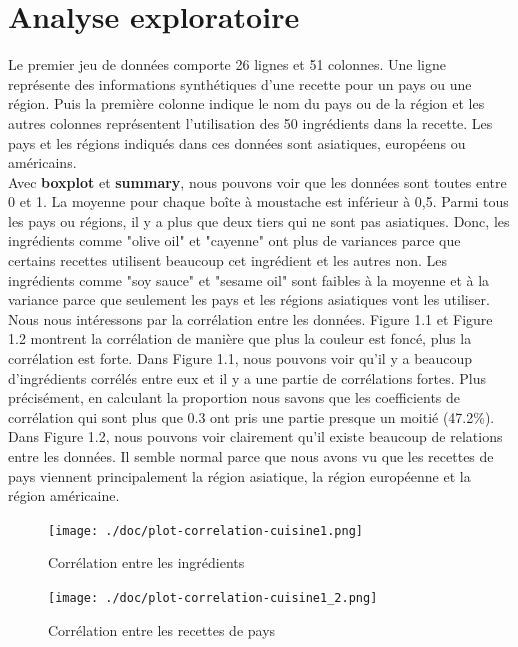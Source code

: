 \documentclass[a4paper, titlepage]{report}
\begin{document}
\section{Analyse exploratoire}
Le premier jeu de données comporte 26 lignes et 51 colonnes. Une ligne représente des informations synthétiques d'une recette pour un pays ou une région. Puis la première colonne indique le nom du pays ou de la région et les autres colonnes représentent l'utilisation des 50 ingrédients dans la recette. Les pays et les régions indiqués dans ces données sont asiatiques, européens ou américains.\\
\indent Avec \textbf{boxplot} et \textbf{summary}, nous pouvons voir que les données sont toutes entre 0 et 1. La moyenne pour chaque boîte à moustache est inférieur à 0,5. Parmi tous les pays ou régions, il y a plus que deux tiers qui ne sont pas asiatiques. Donc, les ingrédients comme "olive oil" et "cayenne" ont plus de variances parce que certains recettes utilisent beaucoup cet ingrédient et les autres non. Les ingrédients comme "soy sauce" et "sesame oil" sont faibles à la moyenne et à la variance parce que seulement les pays et les régions asiatiques vont les utiliser.\\
\indent Nous nous intéressons par la corrélation entre les données. Figure 1.1 et Figure 1.2 montrent la corrélation de manière que plus la couleur est foncé, plus la corrélation est forte. Dans Figure 1.1, nous pouvons voir qu'il y a beaucoup d'ingrédients corrélés entre eux et il y a une partie de corrélations fortes. Plus précisément, en calculant la proportion nous savons que les coefficients de corrélation qui sont plus que 0.3 ont pris une partie presque un moitié (47.2\%). Dans Figure 1.2, nous pouvons voir clairement qu'il existe beaucoup de relations entre les données. Il semble normal parce que nous avons vu que les recettes de pays viennent principalement la région asiatique, la région européenne et la région américaine.
\begin{figure}[htbp]
\centering
\begin{minipage}[t]{0.5\textwidth}
\centering
\texttt{[image: ./doc/plot-correlation-cuisine1.png]}
\caption{Corrélation entre les ingrédients}
\end{minipage}
\begin{minipage}[t]{0.48\textwidth}
\centering
\texttt{[image: ./doc/plot-correlation-cuisine1\_2.png]}
\caption{Corrélation entre les recettes de pays}
\end{minipage}
\end{figure}
\end{document}
